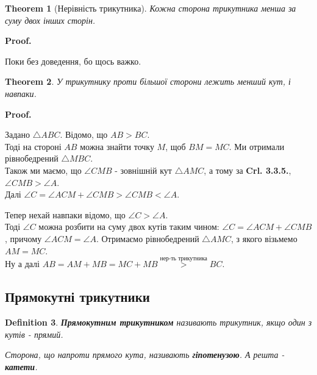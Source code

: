 \documentclass[a4paper, 10pt]{article}
\makeatletter
\def\qed{$\blacksquare$}
\theoremstyle{theoremdd}
\newtheorem{theorem}{Theorem}[subsection]
\theoremstyle{theoremdd}
\theoremstyle{theoremdd}
\newtheorem{definition}[theorem]{Definition}
\theoremstyle{theoremdd}
\theoremstyle{theoremdd}
\theoremstyle{theoremdd}
\theoremstyle{theoremdd}
\theoremstyle{theoremdd}
\theoremstyle{theoremdd}
\renewenvironment{proof}[1][Proof.\\]{\par
\pushQED{\hfill \qed}%
\normalfont \topsep6\p@\@plus6\p@\relax
\trivlist
\item\relax
{\bfseries
#1\@addpunct{.}}\hspace\labelsep\ignorespaces
}{%
\popQED\endtrivlist\@endpefalse
}
\makeatother
\begin{document}
\begin{theorem}[Нерівність трикутника]
Кожна сторона трикутника менша за суму двох інших сторін.
\end{theorem}

\begin{proof}
Поки без доведення, бо щось важко.
\end{proof}

\begin{theorem}
У трикутнику проти більшої сторони лежить менший кут, і навпаки.
\end{theorem}

\begin{proof}
Задано $\triangle ABC$. Відомо, що $AB > BC$.\\
Тоді на стороні $AB$ можна знайти точку $M$, щоб $BM = MC$. Ми отримали рівнобедрений $\triangle MBC$.\\
Також ми маємо, що $\angle CMB$ - зовнішній кут $\triangle AMC$, а тому за \textbf{Crl. 3.3.5.}, $\angle CMB > \angle A$.\\
Далі $\angle C = \angle ACM + \angle CMB > \angle CMB < \angle A$.
\begin{figure}[H]
\centering
{}
\end{figure}
Тепер нехай навпаки відомо, що $\angle C > \angle A$.\\
Тоді $\angle C$ можна розбити на суму двох кутів таким чином: $\angle C = \angle ACM + \angle CMB$, причому $\angle ACM = \angle A$. Отримаємо рівнобедрений $\triangle AMC$, з якого візьмемо $AM = MC$.\\
Ну а далі $AB = AM + MB = MC + MB \overset{\text{нер-ть трикутника}}{>} BC$.
\end{proof}

\subsection{Прямокутні трикутники}
\begin{definition}
\textbf{Прямокутним трикутником} називають трикутник, якщо один з кутів - прямий.
\begin{figure}[H]
\centering
{}
\end{figure}
Сторона, що напроти прямого кута, називають \textbf{гіпотенузою}. А решта - \textbf{катети}.
\end{definition}
\end{document}
